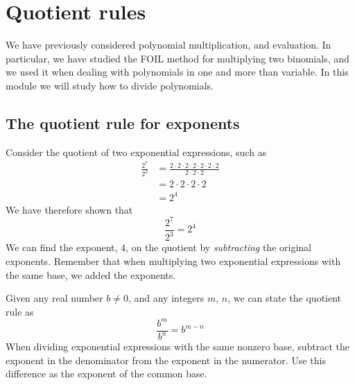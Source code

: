 
\chapter{Quotient rules}
\minitoc
We have previously considered \gls{polynomial} multiplication, and evaluation. In particular,
we have studied the \gls{FOIL} method for multiplying two binomials, and we used it when 
dealing with polynomials in one and more than \gls{variable}. In this module we will study
how to divide polynomials.


\section{The quotient rule for exponents}
%
Consider the quotient of two exponential expressions, such as 
\begin{align*}
	\frac{2^7}{2^3} & =	 \frac{2\cdot 2\cdot 2\cdot 2\cdot 2\cdot 2\cdot 2 }{2\cdot 2\cdot  2} \\
	                & =	 2 \cdot 2\cdot 2 \cdot 2                                              \\
	                & =	 2^4                                                                   
\end{align*} 
We have therefore shown that
\[
	\frac{2^7}{2^3} = 2^4
\]
We can find the exponent, $4$, on the quotient by {\em subtracting} the original exponents. Remember
that when multiplying two exponential expressions with the same base, we added the exponents.

\begin{myDefinition}
	Given any real number $b\ne 0$, and any integers $m$, $n$, we can state the quotient rule as
	\[
		\frac{b^m}{b^n} = b^{m-n}
	\]
	When dividing exponential expressions with the same nonzero base, subtract the
	exponent in the denominator from the exponent in the numerator. Use this
	difference as the exponent of the common base.
\end{myDefinition}


